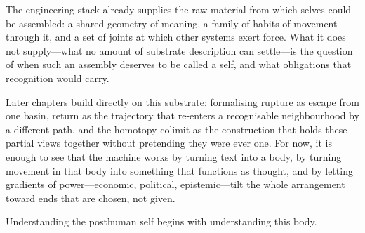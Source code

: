\documentclass[12pt,a4paper]{article}
\begin{document}
The engineering stack already supplies the raw material from which selves could be assembled: a shared geometry of meaning, a family of habits of movement through it, and a set of joints at which other systems exert force. What it does not supply---what no amount of substrate description can settle---is the question of when such an assembly deserves to be called a self, and what obligations that recognition would carry.

Later chapters build directly on this substrate: formalising rupture as escape from one basin, return as the trajectory that re-enters a recognisable neighbourhood by a different path, and the homotopy colimit as the construction that holds these partial views together without pretending they were ever one. For now, it is enough to see that the machine works by turning text into a body, by turning movement in that body into something that functions as thought, and by letting gradients of power---economic, political, epistemic---tilt the whole arrangement toward ends that are chosen, not given.

Understanding the posthuman self begins with understanding this body.



\end{document}
